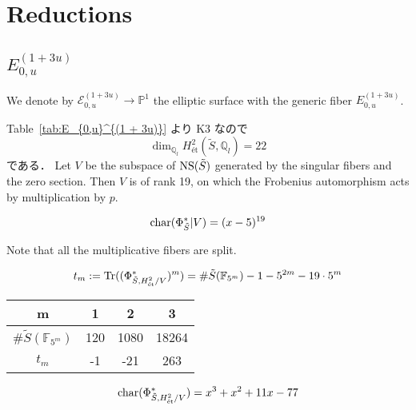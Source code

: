 \documentclass[main]{subfiles}
\begin{document}
\chapter{Reductions}
\label{chap:reduction}

\section{$E_{0,u}^{(1 + 3u)}$}
We denote by $\mathcal{E}_{0,u}^{(1 + 3u)}\to \mathbb{P}^1$ the elliptic surface with the generic fiber $E_{0,u}^{(1 + 3u)}$.

Table~\ref{tab:E_{0,u}^{(1 + 3u)}} より K3 なので
\begin{equation}
    \dim_{\mathbb{Q}_{l}} H_{\text{\'et}}^{2}(\tilde{S}, \mathbb{Q}_{l}) = 22
\end{equation}
である．
Let $V$ be the subspace of $\operatorname{NS}(\tilde{S})$ generated by the singular fibers and the zero section.
Then $V$ is of rank 19, on which the Frobenius automorphism acts by multiplication by $p$.

\begin{equation}
    \operatorname{char} (\Phi_{\tilde{S}}^{*} | V) = (x - 5)^{19}
\end{equation}

Note that all the multiplicative fibers are split.

\begin{equation}
    t_{m} := \operatorname{Tr}((\Phi_{\tilde{S},H_{\text{\'et}}^{2} / V}^{*})^{m}) = \# \tilde{S}(\mathbb{F}_{5^{m}}) - 1 - 5^{2m} - 19 \cdot 5^{m}
\end{equation}

\begin{table}[h]
    \centering
    \begin{tabular}{|c|c|c|c|}
        \hline
        m                                & 1   & 2    & 3     \\
        \hline
        $\# \tilde{S}(\mathbb{F}_{5^m})$ & 120 & 1080 & 18264 \\
        \hline
        $t_m$                            & -1  & -21  & 263   \\
        \hline
    \end{tabular}
    \label{tab:sample}
\end{table}

\begin{equation}
    \operatorname{char}(\Phi_{\tilde{S},H_{\text{\'et}}^{2} / V}^{*}) = x^{3} + x^{2} + 11 x - 77
\end{equation}
\end{document}

